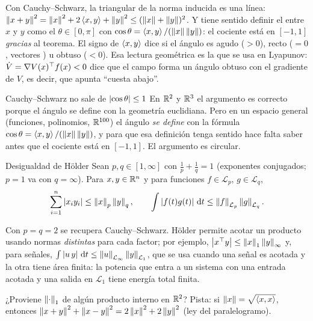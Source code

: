 Con Cauchy--Schwarz, la triangular de la norma inducida es una línea: $\left\lVert x+y\right\rVert^2=\left\lVert x\right\rVert^2+2\left\langle x,y\right\rangle+\left\lVert y\right\rVert^2\le(\left\lVert x\right\rVert+\left\lVert y\right\rVert)^2$. Y tiene sentido definir el  entre $x$ y $y$ como el $\theta\in[0,\pi]$ con $\cos\theta=\left\langle x,y\right\rangle/(\left\lVert x\right\rVert\left\lVert y\right\rVert)$: el cociente está en $[-1,1]$ \emph{gracias} al teorema. El signo de $\left\langle x,y\right\rangle$ dice si el ángulo es agudo ($>0$), recto ($=0$, vectores ) u obtuso ($<0$). Esa lectura geométrica es la que se usa en Lyapunov: $\dot V=\nabla V(x)^{\top} f(x)<0$ dice que el campo forma un ángulo obtuso con el gradiente de $V$, es decir, que apunta ``cuesta abajo''.

\begin{trampa}[label=tr:pm-circular]{Cauchy--Schwarz no sale de $\left\lvert \cos\theta\right\rvert\le1$}
En $\mathbb{R}^2$ y $\mathbb{R}^3$ el argumento es correcto porque el ángulo se define con la geometría euclidiana. Pero en un espacio general (funciones, polinomios, $\mathbb{R}^{100}$) el ángulo \emph{se define} con la fórmula $\cos\theta=\left\langle x,y\right\rangle/(\left\lVert x\right\rVert\left\lVert y\right\rVert)$, y para que esa definición tenga sentido hace falta saber antes que el cociente está en $[-1,1]$. El argumento es circular.
\end{trampa}

\begin{teorema}[label=thm:pm-holder]{Desigualdad de Hölder}
Sean $p,q\in[1,\infty]$ con $\frac1p+\frac1q=1$ (exponentes conjugados; $p=1$ va con $q=\infty$). Para $x,y\in\mathbb{R}^n$ y para funciones $f\in\mathcal{L}_p$, $g\in\mathcal{L}_q$,
\[
  \sum_{i=1}^n\left\lvert x_iy_i\right\rvert\le\left\lVert x\right\rVert_p\left\lVert y\right\rVert_q,\qquad
  \int\left\lvert f(t)g(t)\right\rvert\,\mathrm{d} t\le\left\lVert f\right\rVert_{\mathcal{L}_p}\left\lVert g\right\rVert_{\mathcal{L}_q} .
\]
\end{teorema}

Con $p=q=2$ se recupera Cauchy--Schwarz. Hölder permite acotar un producto usando normas \emph{distintas} para cada factor; por ejemplo, $\left\lvert x^{\top} y\right\rvert\le\left\lVert x\right\rVert_1\left\lVert y\right\rVert_\infty$ y, para señales, $\int\left\lvert u\,y\right\rvert\,\mathrm{d} t\le\left\lVert u\right\rVert_{\mathcal{L}_{\infty}}\left\lVert y\right\rVert_{\mathcal{L}_1}$, que se usa cuando una señal es acotada y la otra tiene área finita: la potencia que entra a un sistema con una entrada acotada y una salida en $\mathcal{L}_1$ tiene energía total finita.

\begin{pausa}
¿Proviene $\left\lVert \cdot\right\rVert_1$ de algún producto interno en $\mathbb{R}^2$? Pista: si $\left\lVert x\right\rVert=\sqrt{\left\langle x,x\right\rangle}$, entonces $\left\lVert x+y\right\rVert^2+\left\lVert x-y\right\rVert^2=2\left\lVert x\right\rVert^2+2\left\lVert y\right\rVert^2$ (ley del paralelogramo).
\end{pausa}
